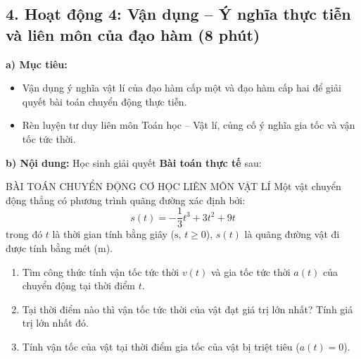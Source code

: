 \documentclass[12pt, a4paper]{article}
\begin{document}
\vspace{5pt}

\subsection*{4. Hoạt động 4: Vận dụng -- Ý nghĩa thực tiễn và liên môn của đạo hàm (8 phút)}

\noindent \textbf{a) Mục tiêu:}
\begin{itemize}[leftmargin=0.6cm]
    \item Vận dụng ý nghĩa vật lí của đạo hàm cấp một và đạo hàm cấp hai để giải quyết bài toán chuyển động thực tiễn.
    \item Rèn luyện tư duy liên môn Toán học -- Vật lí, củng cố ý nghĩa gia tốc và vận tốc tức thời.
\end{itemize}

\noindent \textbf{b) Nội dung:}
Học sinh giải quyết \textbf{Bài toán thực tế} sau:

\begin{stembox}{BÀI TOÁN CHUYỂN ĐỘNG CƠ HỌC LIÊN MÔN VẬT LÍ}
Một vật chuyển động thẳng có phương trình quãng đường xác định bởi:
$$s(t) = -\dfrac{1}{3}t^3 + 3t^2 + 9t$$
trong đó $t$ là thời gian tính bằng giây ($\text{s}$, $t \ge 0$), $s(t)$ là quãng đường vật đi được tính bằng mét ($\text{m}$).
\begin{enumerate}[label=\alph*)]
    \item Tìm công thức tính vận tốc tức thời $v(t)$ và gia tốc tức thời $a(t)$ của chuyển động tại thời điểm $t$.
    \item Tại thời điểm nào thì vận tốc tức thời của vật đạt giá trị lớn nhất? Tính giá trị lớn nhất đó.
    \item Tính vận tốc của vật tại thời điểm gia tốc của vật bị triệt tiêu ($a(t) = 0$).
\end{enumerate}
\end{stembox}
\end{document}
